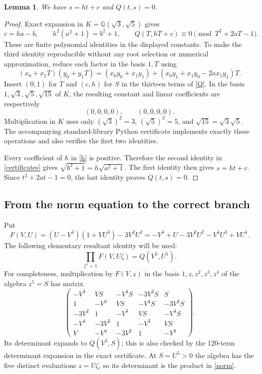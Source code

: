 \documentclass[11pt]{article}
\newtheorem{lemma}{Lemma}
\begin{document}
\begin{lemma}\label{algebra}
We have $s=ht+c$ and $Q(t,s)=0$.
\end{lemma}
\begin{proof}
Exact expansion in $K=\mathbb Q(\sqrt3,\sqrt5)$ gives
\begin{equation}\label{certificates}
 c=ha-b,\qquad h^2(a^2+1)=b^2+1,\qquad
 Q(T,hT+c)\equiv0\pmod{T^2+2aT-1}.
\end{equation}
These are finite polynomial identities in the displayed constants.
To make the third identity reproducible without any root selection or
numerical approximation, reduce each factor in the basis $1,T$ using
\[
 (x_0+x_1T)(y_0+y_1T)
 =(x_0y_0+x_1y_1)
 +(x_0y_1+x_1y_0-2ax_1y_1)T.
\]
Insert $(0,1)$ for $T$ and $(c,h)$ for $S$ in the thirteen terms of
\eqref{Q}. In the basis $1,\sqrt3,\sqrt5,\sqrt{15}$ of $K$, the
resulting constant and linear coefficients are respectively
\[
 (0,0,0,0),\qquad(0,0,0,0).
\]
Multiplication in $K$ uses only $(\sqrt3)^2=3$,
$(\sqrt5)^2=5$, and $\sqrt{15}=\sqrt3\sqrt5$.
The accompanying standard-library Python certificate implements
exactly these operations and also verifies the first two identities.

Every coefficient of $h$ in \eqref{h} is positive. Therefore the second
identity in \eqref{certificates} gives
$\sqrt{b^2+1}=h\sqrt{a^2+1}$. The first identity then gives
$s=ht+c$. Since $t^2+2at-1=0$, the last identity proves $Q(t,s)=0$.
\end{proof}

\subsection*{From the norm equation to the correct branch}
Put
\[
 F(V,U)=(U-V^3)(1+VU^3)-3V^2U^2
       =-V^3+U-3V^2U^2-V^4U^3+VU^4.
\]
The following elementary resultant identity will be used:
\begin{equation}\label{norm}
 \prod_{\zeta^5=1}F(V,U\zeta)=Q(V^5,U^5).
\end{equation}
For completeness, multiplication by $F(V,z)$ in the basis
$1,z,z^2,z^3,z^4$ of the algebra $z^5=S$ has matrix
\[
 \begin{pmatrix}
 -V^3&VS&-V^4S&-3V^2S&S\\
 1&-V^3&VS&-V^4S&-3V^2S\\
 -3V^2&1&-V^3&VS&-V^4S\\
 -V^4&-3V^2&1&-V^3&VS\\
 V&-V^4&-3V^2&1&-V^3
 \end{pmatrix}.
\]
Its determinant expands to $Q(V^5,S)$; this is also checked by the
120-term determinant expansion in the exact certificate. At $S=U^5>0$
the algebra has the five distinct evaluations $z=U\zeta$, so its
determinant is the product in \eqref{norm}.
\end{document}
